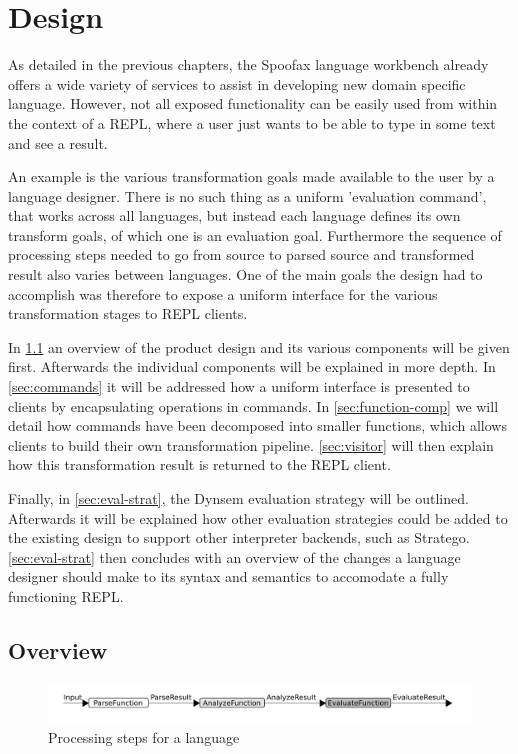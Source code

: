 \chapter{Design}
\label{cha:design}

As detailed in the previous chapters, the Spoofax language workbench already
offers a wide variety of services to assist in developing new domain specific
language. However, not all exposed functionality can be easily used from within
the context of a REPL, where a user just wants to be able to type in some text
and see a result.

An example is the various transformation goals made available to the user by a
language designer. There is no such thing as a uniform 'evaluation command',
that works across all languages, but instead each language defines its own
transform goals, of which one is an evaluation goal.  Furthermore the sequence
of processing steps needed to go from source to parsed source and transformed
result also varies between languages. One of the main goals the design had to
accomplish was therefore to expose a uniform interface for the various
transformation stages to REPL clients.

In \cref{sec:overview} an overview of the product design and its various
components will be given first. Afterwards the individual components will be
explained in more depth. In \cref{sec:commands} it will be addressed how a
uniform interface is presented to clients by encapsulating operations in
commands. In \cref{sec:function-comp} we will detail how commands have been
decomposed into smaller functions, which allows clients to build their own
transformation pipeline. \cref{sec:visitor} will then explain how this
transformation result is returned to the REPL client.

Finally, in \cref{sec:eval-strat}, the Dynsem evaluation strategy will be
outlined.  Afterwards it will be explained how other evaluation strategies
could be added to the existing design to support other interpreter backends,
such as Stratego. \cref{sec:eval-strat} then concludes with an overview of the changes
a language designer should make to its syntax and semantics to accomodate a
fully functioning REPL.

\section{Overview}
\label{sec:overview}


\begin{figure}[h]
  \includegraphics[width=\textwidth]{unit-flow}
  \caption{Processing steps for a language }
\end{figure}

